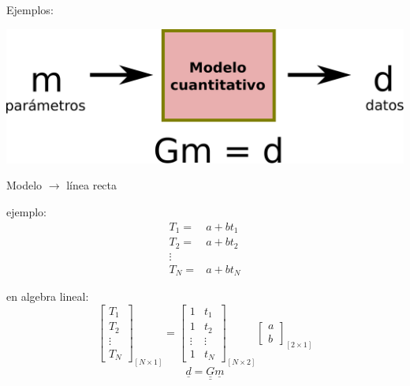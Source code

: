 \documentclass{beamer}
\begin{document}
\begin{frame}
 {Ejemplos:}
 
 \begin{center}
  \includegraphics[width=0.6\linewidth]{images/forward.pdf}  
 \end{center}
 \begin{minipage}{0.45\linewidth}
 \begin{center}
  Modelo $\rightarrow$ línea recta \\
 \end{center}
 ejemplo:
 \begin{align*}
  T_1 = & a + bt_1 \\
  T_2 = & a + bt_2 \\
  \vdots \\
  T_N = & a  + bt_N
 \end{align*}
 \end{minipage}
 \begin{minipage}{0.45\linewidth}
 en algebra lineal:
  \begin{equation*}
   \begin{bmatrix}
    T_1 \\
    T_2 \\
    \vdots \\
    T_N
   \end{bmatrix}_{[N\times1]}
   = 
   \begin{bmatrix}
    1 & t_1 \\
    1 & t_2 \\
    \vdots & \vdots \\
    1 & t_N
   \end{bmatrix}_{[N\times2]}
   \begin{bmatrix}
   a \\
   b
   \end{bmatrix}_{[2\times1]}
 \end{equation*} 
  \begin{equation*}
  \underline{d} = \underline{\underline{G}} \underline{m}
 \end{equation*} 
 \end{minipage}
 
\end{frame}
\end{document}

